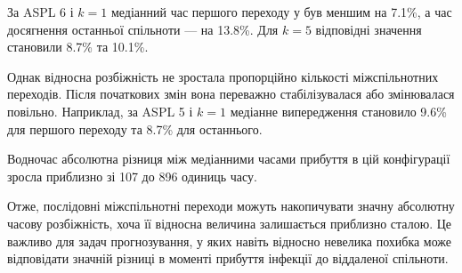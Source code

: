 За ASPL 6 і $k=1$ медіанний
час першого переходу у \TS{}
був меншим на 7.1\%,
а час досягнення останньої спільноти
--- на 13.8\%.
Для $k=5$ відповідні значення
становили 8.7\% та 10.1\%.

Однак відносна розбіжність
не зростала пропорційно кількості
міжспільнотних переходів.
Після початкових змін вона
переважно стабілізувалася
або змінювалася повільно.
Наприклад, за ASPL 5 і $k=1$
медіанне випередження становило
9.6\% для першого переходу
та 8.7\% для останнього.

Водночас абсолютна різниця
між медіанними часами прибуття
в цій конфігурації зросла
приблизно зі 107 до 896
одиниць часу.

Отже, послідовні міжспільнотні
переходи можуть накопичувати
значну абсолютну часову розбіжність,
хоча її відносна величина
залишається приблизно сталою.
Це важливо для задач прогнозування,
у яких навіть відносно невелика
похибка може відповідати значній
різниці в моменті прибуття інфекції
до віддаленої спільноти.

